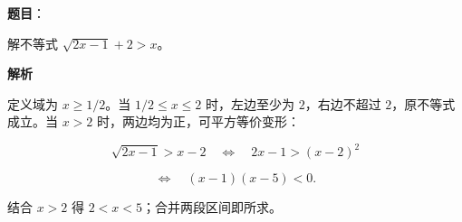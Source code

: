 \begin{answer}

\textbf{题目}：

解不等式 \(\sqrt{2x-1}+2>x\)。

\textbf{解析}

定义域为 $x\ge1/2$。当 $1/2\le x\le2$ 时，左边至少为 $2$，右边不超过 $2$，原不等式成立。当 $x>2$ 时，两边均为正，可平方等价变形：

\nopagebreak[4]
\[\sqrt{2x-1}>x-2\quad\Longleftrightarrow\quad 2x-1>(x-2)^2\]

\nopagebreak[4]
\[\Longleftrightarrow\quad (x-1)(x-5)<0.\]

结合 $x>2$ 得 $2<x<5$；合并两段区间即所求。

\gkanswer{答案：$\left[\frac12,5\right)$。}

\end{answer}
